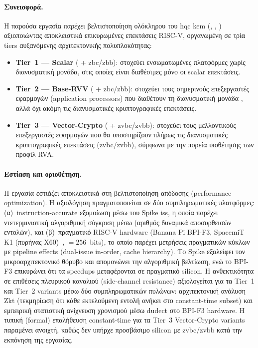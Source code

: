 \paragraph{Συνεισφορά.}
Η παρούσα εργασία παρέχει βελτιστοποίηση ολόκληρου του \gls{hqc} \gls{kem}
(\KeyGen, \Encaps, \Decaps) αξιοποιώντας αποκλειστικά επικυρωμένες
επεκτάσεις RISC-V, οργανωμένη σε τρία tiers αυξανόμενης
αρχιτεκτονικής πολυπλοκότητας:
%
\begin{itemize}
  \item \textbf{Tier~1 — Scalar} ( + \gls{zbc}/\gls{zbb}): στοχεύει
    ενσωματωμένες πλατφόρμες χωρίς διανυσματική μονάδα, στις οποίες
    είναι διαθέσιμες μόνο οι scalar επεκτάσεις.

  \item \textbf{Tier~2 — Base-RVV} ( + \gls{zbc}/\gls{zbb}): στοχεύει
    τους σημερινούς επεξεργαστές εφαρμογών (application processors) που διαθέτουν
    τη διανυσματική μονάδα , αλλά όχι ακόμη τις διανυσματικές
    κρυπτογραφικές επεκτάσεις.

  \item \textbf{Tier~3 — Vector-Crypto} ( + \gls{zvbc}/\gls{zvbb}):
    στοχεύει τους μελλοντικούς επεξεργαστές εφαρμογών που θα υποστηρίζουν πλήρως
    τις διανυσματικές κρυπτογραφικές επεκτάσεις (\gls{zvbc}/\gls{zvbb}), σύμφωνα με
    την πορεία υιοθέτησης των προφίλ RVA.
\end{itemize}

\paragraph{Εστίαση και οριοθέτηση.}
Η εργασία εστιάζει αποκλειστικά στη βελτιστοποίηση απόδοσης (performance
optimization). Η αξιολόγηση πραγματοποιείται σε δύο συμπληρωματικές
πλατφόρμες: (α)~instruction-accurate εξομοίωση μέσω του Spike \gls{iss}, η
οποία παρέχει ντετερμινιστική αλγοριθμική σύγκριση μέσω \instret (αριθμός
δυναμικά αποσυρθεισών εντολών), και (β)~πραγματικό RISC-V hardware (Banana Pi
BPI-F3, SpacemiT K1 (πυρήνας X60)~\cite{SpacemiT-K1-datasheet}, \VLEN $= \num{256}$~bits), το οποίο παρέχει
μετρήσεις πραγματικών κύκλων με pipeline effects (dual-issue
in-order, cache hierarchy). Το Spike εξαλείφει τον μικροαρχιτεκτονικό θόρυβο
και απομονώνει την αλγοριθμική βελτίωση, ενώ το BPI-F3 επικυρώνει ότι τα
speedups μεταφέρονται σε πραγματικό silicon. \ifTODO
Η ανθεκτικότητα σε επιθέσεις
πλευρικού καναλιού (side-channel resistance) αξιολογείται για τα Tier~1 και
Tier~2 variants μέσω δύο συμπληρωματικών πυλώνων: αρχιτεκτονική ανάλυση Zkt
(τεκμηρίωση ότι κάθε εκτελούμενη εντολή ανήκει στο constant-time subset) και
εμπειρική στατιστική ανίχνευση χρονισμού μέσω dudect στο BPI-F3 hardware.
Η τυπική (formal) επαλήθευση constant-time για τα Tier~3 Vector-Crypto
variants παραμένει ανοιχτή, καθώς δεν υπήρχε προσβάσιμο silicon με \gls{zvbc}/\gls{zvbb}
κατά την εκπόνηση της εργασίας.
\fi

